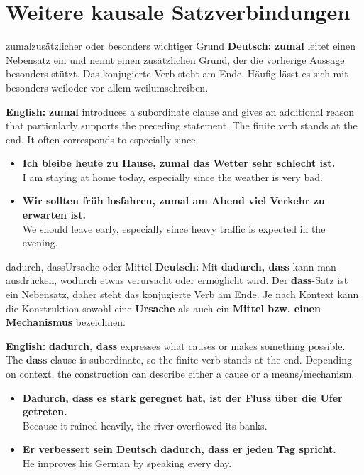 \documentclass[a4paper,11pt]{article}
\newcommand{\GermanText}[1]{\textbf{Deutsch: }#1\par}
\newcommand{\EnglishText}[1]{{\small\color{SoftGray}\textbf{English: }#1\par}}
\newcommand{\ExampleItem}[2]{\item \textbf{#1}\\{\small\color{SoftGray}#2}}
\begin{document}
    \section{Weitere kausale Satzverbindungen}

        \begin{grammarentry}{zumal}{zusätzlicher oder besonders wichtiger Grund}
            \GermanText{\textbf{zumal} leitet einen Nebensatz ein und nennt einen zusätzlichen Grund, der die vorherige Aussage besonders stützt. Das konjugierte Verb steht am Ende. Häufig lässt es sich mit \glqq besonders weil\grqq oder \glqq vor allem weil\grqq umschreiben.}
            \EnglishText{\textbf{zumal} introduces a subordinate clause and gives an additional reason that particularly supports the preceding statement. The finite verb stands at the end. It often corresponds to especially since.}
        \end{grammarentry}

        \begin{exbox}
            \begin{itemize}
                \ExampleItem{Ich bleibe heute zu Hause, zumal das Wetter sehr schlecht ist.}{I am staying at home today, especially since the weather is very bad.}
                \ExampleItem{Wir sollten früh losfahren, zumal am Abend viel Verkehr zu erwarten ist.}{We should leave early, especially since heavy traffic is expected in the evening.}
            \end{itemize}
        \end{exbox}

        \begin{grammarentry}{dadurch, dass}{Ursache oder Mittel}
            \GermanText{Mit \textbf{dadurch, dass} kann man ausdrücken, wodurch etwas verursacht oder ermöglicht wird. Der \textbf{dass}-Satz ist ein Nebensatz, daher steht das konjugierte Verb am Ende. Je nach Kontext kann die Konstruktion sowohl eine \textbf{Ursache} als auch ein \textbf{Mittel bzw. einen Mechanismus} bezeichnen.}
            \EnglishText{\textbf{dadurch, dass} expresses what causes or makes something possible. The \textbf{dass} clause is subordinate, so the finite verb stands at the end. Depending on context, the construction can describe either a cause or a means/mechanism.}
        \end{grammarentry}

        \begin{exbox}
            \begin{itemize}
                \ExampleItem{Dadurch, dass es stark geregnet hat, ist der Fluss über die Ufer getreten.}{Because it rained heavily, the river overflowed its banks.}
                \ExampleItem{Er verbessert sein Deutsch dadurch, dass er jeden Tag spricht.}{He improves his German by speaking every day.}
            \end{itemize}
        \end{exbox}
\end{document}
